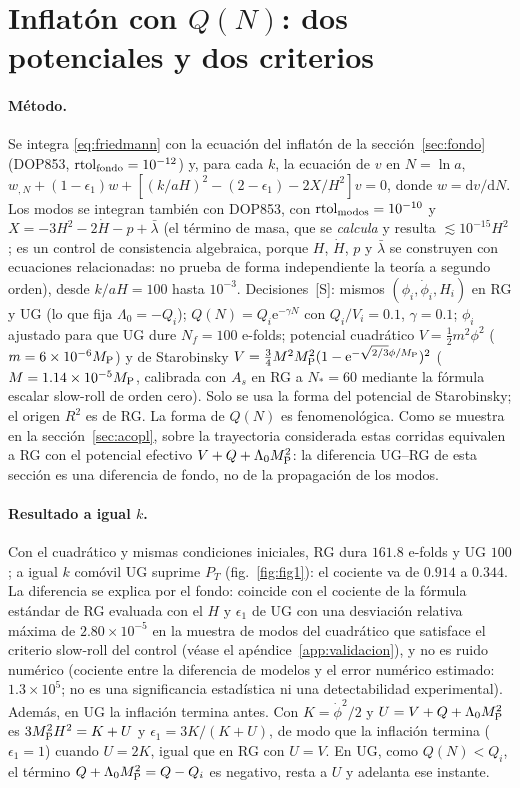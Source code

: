 \documentclass[11pt,a4paper]{article}
\numberwithin{equation}{section}
\newcommand{\MP}{M_{\rm P}}\newcommand{\kap}{\kappa}\newcommand{\Lb}{\bar\lambda}\newcommand{\dd}{\mathrm d}\newcommand{\ee}{\mathrm e}
\newcommand{\etq}[1]{\,{\footnotesize\color{gray}[#1]}}
\begin{document}
\section{Inflat\'on con $Q(N)$: dos potenciales y dos criterios}
\label{sec:inflaton}
\paragraph{M\'etodo.} Se integra \eqref{eq:friedmann} con la ecuaci\'on del inflat\'on de la secci\'on~\ref{sec:fondo} (DOP853, $\mathrm{rtol}_{\rm fondo}=10^{-12}$) y, para cada $k$, la ecuaci\'on de $v$ en $N=\ln a$,
$w_{,N}+(1-\epsilon_1)w+[(k/aH)^2-(2-\epsilon_1)-2X/H^2]v=0$, donde $w=\dd v/\dd N$. Los modos se integran también con DOP853, con $\mathrm{rtol}_{\rm modos}=10^{-10}$ y $X=-3H^2-2\dot H-p+\bar\lambda$ (el t\'ermino de masa, que se \emph{calcula} y resulta $\lesssim10^{-15}H^2$; es un control de consistencia algebraica, porque $H$, $\dot H$, $p$ y $\bar\lambda$ se construyen con ecuaciones relacionadas: no prueba de forma independiente la teor\'ia a segundo orden), desde $k/aH=100$ hasta $10^{-3}$. Decisiones \etq{S}: mismos $(\phi_i,\dot\phi_i,H_i)$ en RG y UG (lo que fija $\Lambda_0=-Q_i$); $Q(N)=Q_i\ee^{-\gamma N}$ con $Q_i/V_i=0.1$, $\gamma=0.1$; $\phi_i$ ajustado para que UG dure $N_f=100$ e-folds; potencial cuadr\'atico $V=\tfrac12m^2\phi^2$ ($m=6\times10^{-6}\MP$) y de Starobinsky \cite{starobinsky80,defelice10} $V=\tfrac34M^2\MP^2(1-\ee^{-\sqrt{2/3}\phi/\MP})^2$ ($M=1.14\times10^{-5}\MP$, calibrada con $A_s$ en RG a $N_*=60$ mediante la fórmula escalar slow-roll de orden cero). Solo se usa la forma del potencial de Starobinsky; el origen $R^2$ es de RG. La forma de $Q(N)$ es fenomenol\'ogica. Como se muestra en la secci\'on~\ref{sec:acopl}, sobre la trayectoria considerada estas corridas equivalen a RG con el potencial efectivo $V+Q+\Lambda_0\MP^2$: la diferencia UG--RG de esta secci\'on es una diferencia de fondo, no de la propagaci\'on de los modos.

\paragraph{Resultado a igual $k$.} Con el cuadr\'atico y mismas condiciones iniciales, RG dura $161.8$ e-folds y UG $100$; a igual $k$ comóvil UG suprime $P_T$ (fig.~\ref{fig:fig1}): el cociente va de $0.914$ a $0.344$. La diferencia se explica por el fondo: coincide con el cociente de la f\'ormula est\'andar de RG evaluada con el $H$ y $\epsilon_1$ de UG con una desviación relativa máxima de $2.80\times10^{-5}$ en la muestra de modos del cuadrático que satisface el criterio slow-roll del control (véase el apéndice~\ref{app:validacion}), y no es ruido num\'erico (cociente entre la diferencia de modelos y el error num\'erico estimado: $1.3\times10^5$; no es una significancia estad\'istica ni una detectabilidad experimental). Adem\'as, en UG la inflaci\'on termina antes. Con $K=\dot\phi^2/2$ y $U=V+Q+\Lambda_0\MP^2$ es $3\MP^2H^2=K+U$ y $\epsilon_1=3K/(K+U)$, de modo que la inflaci\'on termina ($\epsilon_1=1$) cuando $U=2K$, igual que en RG con $U=V$. En UG, como $Q(N)<Q_i$, el t\'ermino $Q+\Lambda_0\MP^2=Q-Q_i$ es negativo, resta a $U$ y adelanta ese instante.
\end{document}

